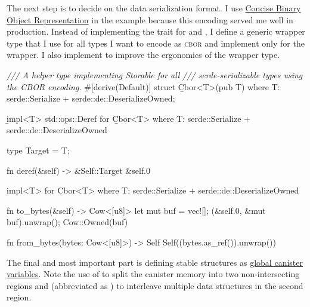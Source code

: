 \documentclass{article}
\begin{document}
The next step is to decide on the data serialization format.
I use \href{https://cbor.io/}{Concise Binary Object Representation} in the example because this encoding served me well in production.
Instead of implementing the \href{#storable-trait}{} trait for  and , I define a generic wrapper type  that I use for all types I want to encode as \textsc{cbor} and implement \href{#storable-trait}{} only for the wrapper.
I also implement \href{https://doc.rust-lang.org/std/ops/trait.Deref.html}{} to improve the ergonomics of the wrapper type.

\begin{code}[rust]
\emph{/// A helper type implementing Storable for all}
\emph{/// serde-serializable types using the CBOR encoding.}
#[derive(Default)]
struct \b{Cbor}<T>(pub T)
where T: serde::Serialize + serde::de::DeserializeOwned;

\b{impl}<T> std::ops::Deref for \b{Cbor}<T>
where T: serde::Serialize + serde::de::DeserializeOwned
{
  type Target = T;

  fn deref(&self) -> &Self::Target { &self.0 }
}

\b{impl}<T> \href{#storable-trait}{} for \b{Cbor}<T>
where T: serde::Serialize + serde::de::DeserializeOwned
{
  fn to_bytes(&self) -> Cow<[u8]> {
    let mut buf = vec![];
    \href{https://docs.rs/ciborium/0.2.0/ciborium/ser/fn.into_writer.html}{}(&self.0, &mut buf).unwrap();
    Cow::Owned(buf)
  }

  fn from_bytes(bytes: Cow<[u8]>) -> Self {
    Self(\href{https://docs.rs/ciborium/0.2.0/ciborium/de/fn.from_reader.html}{}(bytes.as_ref()).unwrap())
  }
}
\end{code}

The final and most important part is defining stable structures as \href{/posts/01-effective-rust-canisters.html#use-threadlocal}{global canister variables}.
Note the use of \href{#restricted-memory}{} to split the canister memory into two non-intersecting regions and \href{#memory-manager}{} (abbreviated as ) to interleave multiple data structures in the second region.
\end{document}
